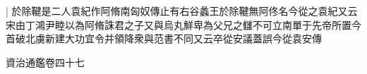 |{
	於除鞬是二人袁紀作阿脩南匈奴傳止有右谷蠡王於除鞬無阿佟名今從之袁紀又云宋由丁鴻尹睦以為阿脩誅君之子又與烏丸鮮卑為父兄之讎不可立南單于先帝所置今首破北虜新建大功宜令并領降衆與范書不同又云卒從安議蓋誤今從袁安傳}


資治通鑑卷四十七
















































































































































